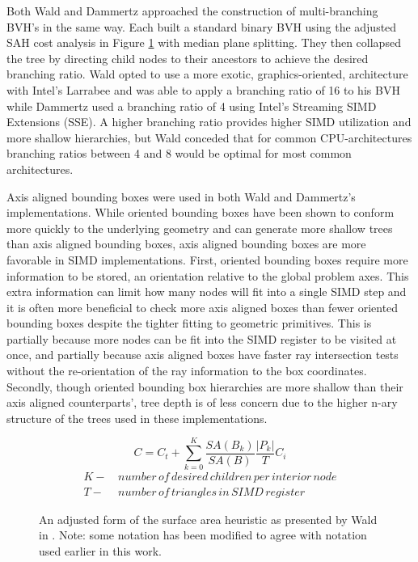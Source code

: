Both Wald and Dammertz approached the construction of multi-branching BVH's in
the same way. Each built a standard binary BVH using the adjusted SAH cost
analysis in Figure \ref{adjusted_SAH} with median plane splitting. They then
collapsed the tree by directing child nodes to their ancestors to achieve the
desired branching ratio. Wald opted to use a more exotic, graphics-oriented,
architecture with Intel's Larrabee and was able to apply a branching ratio of 16
to his BVH while Dammertz used a branching ratio of 4 using Intel's Streaming
SIMD Extensions (SSE). A higher branching ratio provides higher SIMD utilization
and more shallow hierarchies, but Wald conceded that for common CPU-architectures
branching ratios between 4 and 8 would be optimal for most common architectures.

Axis aligned bounding boxes were used in both Wald and Dammertz's
implementations. While oriented bounding boxes have been shown to conform more
quickly to the underlying geometry and can generate more shallow trees than axis
aligned bounding boxes, axis aligned bounding boxes are more favorable in SIMD
implementations.  First, oriented bounding boxes require more information to be
stored, an orientation relative to the global problem axes. This extra
information can limit how many nodes will fit into a single SIMD step and it is
often more beneficial to check more axis aligned boxes than fewer oriented
bounding boxes despite the tighter fitting to geometric primitives. This is
partially because more nodes can be fit into the SIMD register to be visited at
once, and partially because axis aligned boxes have faster ray intersection
tests without the re-orientation of the ray information to the box
coordinates. Secondly, though oriented bounding box hierarchies are more shallow
than their axis aligned counterparts', tree depth is of less concern due to the higher n-ary
structure of the trees used in these implementations.

\begin{figure}[H]
  \begin{equation}
    C = C_t + \sum_{k=0}^{K} \frac{SA(B_k)}{SA(B)}\frac{|P_k|}{T}C_i
  \end{equation}
  \begin{align*}
    K - & \, number \, of \, desired \, children \, per \, interior \, node \\
    T - & \, number \, of \, triangles \, in \, SIMD \, register
  \end{align*}
  \caption{An adjusted form of the surface area heuristic as presented by Wald in \cite{Wald_2008}. Note: some notation has been modified to agree with notation used earlier in this work.}
  \label{adjusted_SAH}
\end{figure}

